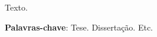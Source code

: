 

\setlength{\absparsep}{18pt} %
\begin{resumo}
	
Texto.

 \textbf{Palavras-chave}: Tese. Dissertação. Etc. 
\end{resumo}